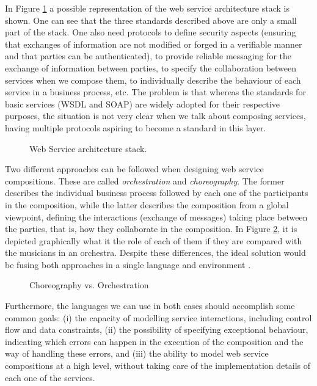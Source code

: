 In Figure \ref{Figure1} a possible representation of the web service architecture stack is shown. 
One can see that the three standards described above are only a small part of the stack. 
One also need protocols to define security aspects (ensuring that exchanges of information 
are not modified or forged in a verifiable manner and that parties can be authenticated), 
to provide reliable messaging for the exchange of information between parties, 
to specify the collaboration between services when we compose them, 
to individually describe the behaviour of each service in a business process, etc. 
The problem is that whereas the standards for basic services (WSDL and SOAP) 
are widely adopted for their respective purposes, the situation is not very 
clear when we talk about composing services, 
having multiple protocols aspiring to become a standard in this layer.

\begin{figure}[h]
\begin{center}
\end{center}
\caption{Web Service architecture stack.}
\label{Figure1}
\end{figure}

Two different approaches can be followed when designing web service compositions. 
These are called \textit{orchestration} and \textit{choreography}. 
The former describes the individual business process followed by 
each one of the participants in the composition, 
while the latter describes the composition from a global viewpoint, 
defining the interactions (exchange of messages) taking place between the parties, that is, 
how they collaborate in the composition. In Figure \ref{orch}, it is depicted graphically what it the role
of each of them if they are compared with the musicians in an orchestra. Despite these differences, the ideal solution would 
be fusing both approaches in a single language and environment \cite{Papazoglou2007}.

\begin{figure}[h]
\begin{center}
\end{center}
\caption{Choreography vs. Orchestration}
\label{orch}
\end{figure}

Furthermore, the languages we can use in both cases should accomplish some common goals: 
(i) the capacity of modelling service interactions, including control flow and data constraints, 
(ii) the possibility of specifying exceptional behaviour, 
indicating which errors can happen in the execution of the composition 
and the way of handling these errors, and (iii) the ability to model web service compositions at a high level, 
without taking care of the implementation details of each one of the services.

